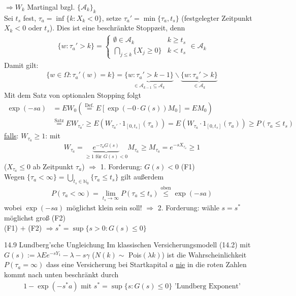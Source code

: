 \documentclass[a4paper,openany]{book}
\theoremstyle{mytheoremstyle}
\theoremstyle{mytheoremstyle2}
\begin{document}
$\Rightarrow W_k$ Martingal bzgl. $\{\mathcal{A}_k\}_k$\\
Sei $t_s$ fest, $\tau_a=\inf\{k:X_k<0\}$, setze $\tau_a'=\min\{\tau_a,t_s\} $ (festgelegter Zeitpunkt $X_k<0$ oder $t_s $). Dies ist eine beschränkte Stoppzeit, denn
\begin{align*}
  \{w:\tau_a'>k\}=\begin{cases}
    \emptyset \in \mathcal{A}_k &k \geq t_s\\
    \bigcap_{j \leq k}^{}{\{X_j \geq 0\}}&k<t_s
  \end{cases}\in \mathcal{A}_k
\end{align*}
Damit gilt: 
\begin{align*}
  \{w \in \Omega :\tau_a'(w)=k\}=\underbrace{\{w:\tau_a'>k-1\}}_{\in \mathcal{A}_{k-1}\subseteq \mathcal{A}_k}\backslash \underbrace{\{w:\tau_a'>k\}}_{\in \mathcal{A}_k}
\end{align*}
Mit dem Satz von optionalen Stopping folgt 
\begin{align*}
  \exp(-sa)
  &=EW_0(\overset{\text{Def.}}=E[\exp(-0 \cdot G(s))M_0]=EM_0)\\
  &\!\!\overset{\text{Satz}}=EW _{\tau_a'}\geq 
  E(W _{\tau_a'}\cdot 1_{[0,t_s]}(\tau_a))=E(W _{\tau_a}\cdot 1_{[0,t_s]}(\tau_a))\geq  P(\tau_a \leq t_s)
\end{align*}
\underline{falls}: $W _{\tau_a}\geq 1$: mit 
\begin{align*}
  W _{\tau_a}=\underbrace{e^{-\tau_aG(s)}}_{\geq 1 \text{ für }G(s)<0}M _{\tau_a}\geq M _{\tau_a}=e^{-sX _{\tau_a}}\geq 1
\end{align*}
($X _{\tau_a}\leq 0 $ ab Zeitpunkt $\tau_a $) $\Rightarrow $ 1. Forderung: $G(s)<0$ (F1) \\
Wegen $\{\tau_a< \infty \}=\bigcup\limits_{t_s \in \mathbb{N}_0}^{}{\{\tau_a \leq t_s\}}$ gilt außerdem 
\begin{align*}
  P(\tau_a < \infty )=\lim\limits _{t_s\to \infty }P(\tau_a \leq t_s)\overset{\text{oben}}\leq \exp(-sa)
\end{align*} wobei $\exp(-sa)$ möglichst klein sein soll!
$\Rightarrow $ 2. Forderung: wähle $s=s^*$ möglichst groß (F2) \\
(F1) $+$ (F2) $\Rightarrow s^*=\sup\{s>0:G(s)\leq 0\} $

\begin{theo}{14.9 Lundberg'sche Ungleichung}{}
  Im klassischen Versicherungsmodell (14.2) mit $G(s):=\lambda Ee^{-sY_1}-\lambda -s \gamma $ ($N(k)\sim$ Pois$(\lambda k)$) ist die Wahrscheinlichkeit $P(\tau _a=\infty )$ dass eine Versicherung bei Startkapital $a $ \underline{nie} in die roten Zahlen kommt nach unten beschränkt durch 
  \begin{align*}
    1-\exp(-s^*a)\text{ mit }s^*=\sup \{s:G(s)\leq 0\}\text{ 'Lundberg Exponent'}
  \end{align*}
\end{theo}
\end{document}
